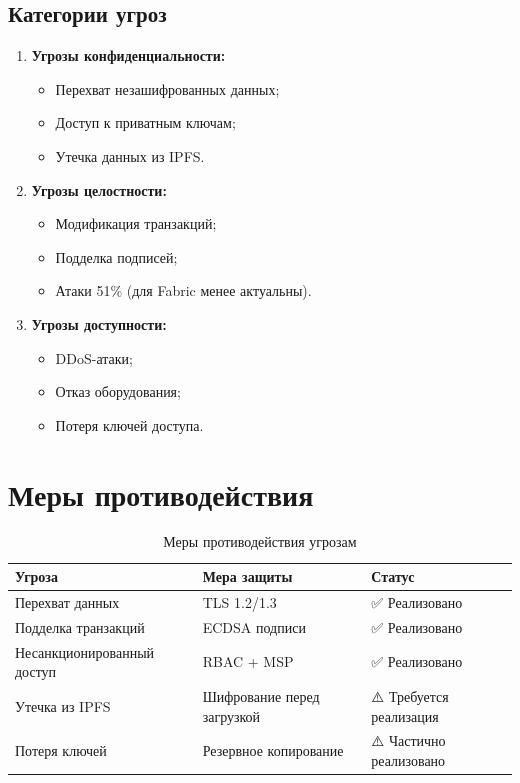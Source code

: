 \documentclass[a4paper,14pt]{extreport}
\begin{document}
\subsection{Категории угроз}

\begin{enumerate}
    \item \textbf{Угрозы конфиденциальности:}
    \begin{itemize}
        \item Перехват незашифрованных данных;
        \item Доступ к приватным ключам;
        \item Утечка данных из IPFS.
    \end{itemize}
    
    \item \textbf{Угрозы целостности:}
    \begin{itemize}
        \item Модификация транзакций;
        \item Подделка подписей;
        \item Атаки 51\% (для Fabric менее актуальны).
    \end{itemize}
    
    \item \textbf{Угрозы доступности:}
    \begin{itemize}
        \item DDoS-атаки;
        \item Отказ оборудования;
        \item Потеря ключей доступа.
    \end{itemize}
\end{enumerate}

\section{Меры противодействия}

\begin{table}[H]
\centering
\caption{Меры противодействия угрозам}
\label{tab:countermeasures}
\begin{tabular}{|l|l|l|}
\hline
\textbf{Угроза} & \textbf{Мера защиты} & \textbf{Статус} \\
\hline
Перехват данных & TLS 1.2/1.3 & ✅ Реализовано \\
Подделка транзакций & ECDSA подписи & ✅ Реализовано \\
Несанкционированный доступ & RBAC + MSP & ✅ Реализовано \\
Утечка из IPFS & Шифрование перед загрузкой & ⚠️ Требуется реализация \\
Потеря ключей & Резервное копирование & ⚠️ Частично реализовано \\
\hline
\end{tabular}
\end{table}
\end{document}

